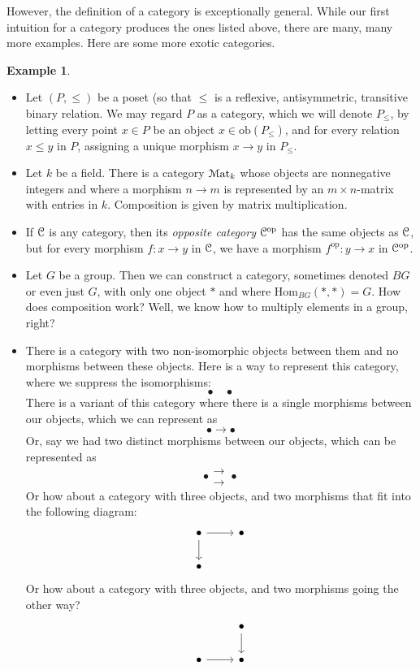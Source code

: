 \documentclass[10pt]{amsart}
\newcommand{\euscr}[1]{\EuScript{#1}}
\theoremstyle{definition}
\newtheorem{ex}[thm]{Example}
\newcommand{\cdef}[1]{\textcolor{Bittersweet}{#1}}
\begin{document}
However, the definition of a category is exceptionally general. While our first intuition for a category produces the ones listed above, there are many, many more examples. Here are some more exotic categories.
\begin{ex}
    \hfill
    \begin{itemize}
        \item Let $(P, \leq)$ be a poset (so that $\leq$ is a reflexive, antisymmetric, transitive binary relation. We may regard $P$ as a category, which we will denote $P_\leq$, by letting every point $x\in P$ be an object $x \in \text{ob}(P_\leq)$, and for every relation $x \leq y$ in $P$, assigning a unique morphism $x \to y$ in $P_\leq$.
        \item Let $k$ be a field. There is a category $\euscr{M}\text{at}_k$ whose objects are nonnegative integers and where a morphism $n \to m$ is represented by an $m \times n$-matrix with entries in $k$. Composition is given by matrix multiplication.
        \item If $\euscr{C}$ is any category, then its \cdef{\emph{opposite category}} $\euscr{C}^{\text{op}}$ has the same objects as $\euscr{C}$, but for every morphism $f:x \to y$ in $\euscr{C}$, we have a morphism $f^{\text{op}}:y \to x$ in $\euscr{C}^{\text{op}}$.
        \item Let $G$ be a group. Then we can construct a category, sometimes denoted $BG$ or even just $G$, with only one object $*$ and where $\text{Hom}_{BG}(*, *) = G$. How does composition work? Well, we know how to multiply elements in a group, right?
        \item There is a category with two non-isomorphic objects between them and no morphisms between these objects. Here is a way to represent this category, where we suppress the isomorphisms:
        \[
        \bullet \quad \bullet
        \]
        There is a variant of this category where there is a single morphisms between our objects, which we can represent as
        \[
        \bullet \to \bullet
        \]
        Or, say we had two distinct morphisms between our objects, which can be represented as
        \[
        \bullet \substack{\to \\ \to} \bullet
        \]
        Or how about a category with three objects, and two morphisms that fit into the following diagram:
        \[\begin{tikzcd}
	   \bullet & \bullet \\
	   \bullet
	   \arrow[from=1-1, to=1-2]
	   \arrow[from=1-1, to=2-1]
        \end{tikzcd}\]
        Or how about a category with three objects, and two morphisms going the other way?
        \[\begin{tikzcd}
	& \bullet \\
	\bullet & \bullet
	\arrow[from=1-2, to=2-2]
	\arrow[from=2-1, to=2-2]
\end{tikzcd}\]    
    
    
    \end{itemize}
\end{ex}
\end{document}
